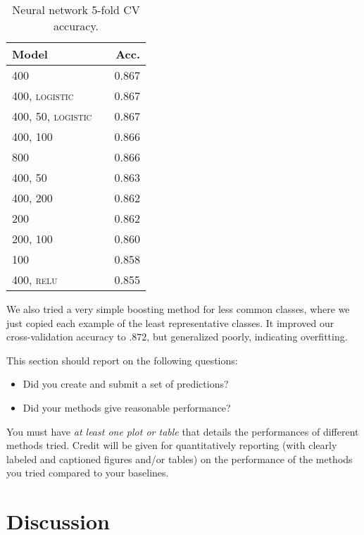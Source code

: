 \documentclass[11pt]{article}
\begin{document}
\begin{table}
	\centering
	\begin{tabular}{llr}
		\toprule
		Model &  & Acc. \\
		\midrule
		\textsc{400} & & 0.867 \\
		\textsc{400, logistic} & & 0.867 \\
		\textsc{400, 50, logistic} & & 0.867  \\
		\textsc{400, 100} & & 0.866 \\
		\textsc{800} & & 0.866 \\
		\textsc{400, 50} & & 0.863  \\
		\textsc{400, 200} & & 0.862 \\
		\textsc{200} & & 0.862 \\
		\textsc{200, 100} & & 0.860 \\
		\textsc{100} & & 0.858 \\
		\textsc{400, relu} & & 0.855 \\
		\bottomrule
	\end{tabular}
	\caption{Neural network 5-fold CV accuracy.}
\end{table}

We also tried a very simple boosting method for less common classes, where we just copied each example of the least representative classes. It improved our cross-validation accuracy to $.872$, but generalized poorly, indicating overfitting.

\pagebreak

This section should report on the following questions: 

\begin{itemize}
\item Did you create and submit a set of predictions? 
  

\item  Did your methods give reasonable performance?  
\end{itemize}

\noindent You must have \textit{at least one plot or table}
that details the performances of different methods tried. 
Credit will be given for quantitatively reporting (with clearly
labeled and captioned figures and/or tables) on the performance of the
methods you tried compared to your baselines.



\section{Discussion} 
\end{document}
